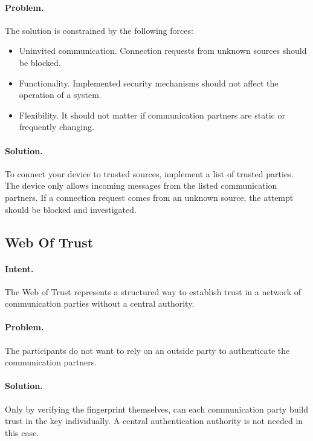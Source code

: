 \paragraph{\textbf{Problem.}} The solution is constrained by the following forces:
\begin{itemize}
	\item Uninvited communication. Connection requests from unknown sources should be blocked.
	\item Functionality. Implemented security mechanisms should not affect the operation of a system.
	\item Flexibility. It should not matter if communication partners are static or frequently changing.
\end{itemize}

\paragraph{\textbf{Solution.}} To connect your device to trusted sources, implement a list of trusted parties. The device only allows incoming messages from the listed communication partners. If a connection request comes from an unknown source, the attempt should be blocked and investigated.


\subsection{Web Of Trust~\cite{Sinnhofer2016}} 
\label{p:trust}

\paragraph{\textbf{Intent.}} The Web of Trust represents a structured way to establish trust in a network of communication parties without a central authority.

\paragraph{\textbf{Problem.}} The participants do not want to rely on an outside party to authenticate the communication partners. 

\paragraph{\textbf{Solution.}} Only by verifying the fingerprint themselves, can each communication party build trust in the key individually. A central authentication authority is not needed in this case.



